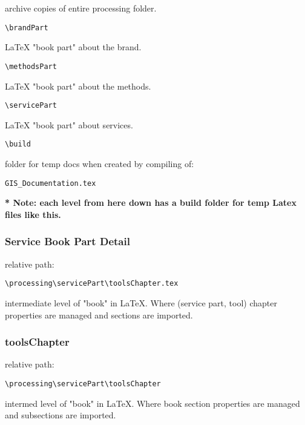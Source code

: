 \documentclass[class=book , crop=false]{standalone}
\begin{document}
\begin{description}
\item archive copies of entire processing folder.
\end{description}
\begin{verbatim}
\brandPart
\end{verbatim}
\begin{description}
\item \LaTeX{} "book part" about the brand.
\end{description}
\begin{verbatim}
\methodsPart
\end{verbatim}
\begin{description}
\item \LaTeX{} "book part" about the methods.
\end{description}
\begin{verbatim}
\servicePart
\end{verbatim}
\begin{description}
\item \LaTeX{} "book part" about services.
\end{description}
\begin{verbatim}
\build
\end{verbatim}
\begin{description}
\item folder for temp docs when created by compiling of:
\begin{verbatim}
GIS_Documentation.tex
\end{verbatim}
\end{description}
\textbf{* Note: each level from here down has a build folder for temp Latex files like this.}
\newpage
\subsubsection{Service Book Part Detail}
relative path:
\begin{verbatim}
\processing\servicePart\toolsChapter.tex
\end{verbatim}
\begin{description}
\item  intermediate level of "book" in \LaTeX{}.  Where (service part, tool) chapter properties are managed and sections are imported.
\end{description}
\subsubsection{toolsChapter}
relative path:
\begin{verbatim}
\processing\servicePart\toolsChapter
\end{verbatim}
intermed level of "book" in \LaTeX{}.  Where book section properties are managed and subsections are imported.
\end{document}
